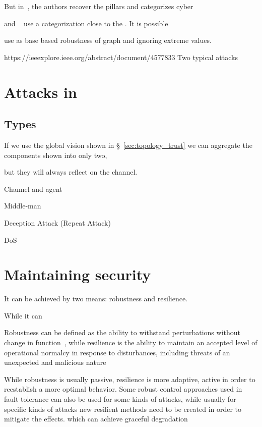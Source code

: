 \documentclass[../main.tex]{subfiles}
\begin{document}
But in~\cite{TeixeiraEtAl2015}, the authors recover the \CIA{} pillars and categorizes cyber

\cite{DibajiEtAl2019} and ~ use a categorization close to the \CIA{}. It is possible

use as base
\cite{MaestreEtAl2018}
\cite{DibajiIshii2015,WangIshii2019,VelardeEtAl2018} based robustness of graph and ignoring extreme values.

https://ieeexplore.ieee.org/abstract/document/4577833
\cite{CaiEtAl2019,ZhangEtAl2021b}
Two typical attacks \cite{ZhangEtAl2021a}

\section{Attacks in \dmpc{}}\label{sec:attacks_in_dmpc}

\subsection{Types}\label{sec:types_of_attacks}
If we use the global vision shown in \S~\ref{sec:topology_trust} we can aggregate the components shown into only two,
\cite{PasqualettiEtAl2013}
\cite{BoemEtAl2020}

but they will always reflect on the channel.


Channel and agent

Middle-man

Deception Attack (Repeat Attack)

DoS

\cite{GuEtAl2016}

\section{Maintaining security}\label{sec:maintaining_security}
It can be achieved by two means: robustness and resilience.

While it can

Robustness can be defined as the ability to withstand perturbations without change in function~\cite{Jen2003}, while resilience
  is the ability to maintain an accepted level of operational normalcy  in  response  to  disturbances,  including  threats  of  an unexpected and malicious nature\cite{Rieger2010}

While robustness is usually passive, resilience is more adaptive, active in order to reestablish a more optimal behavior.
Some robust control approaches used in fault-tolerance can also be used for some kinds of attacks, while usually for specific kinds of attacks new resilient methods need to be created in order to mitigate the effects.
which can achieve graceful degradation
\end{document}
